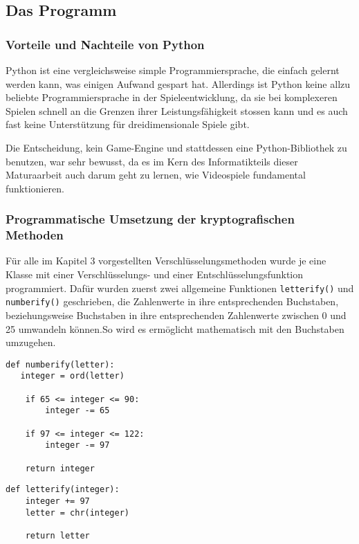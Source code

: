 \subsection{Das Programm}

\subsubsection{Vorteile und Nachteile von Python}
Python ist eine vergleichsweise simple Programmiersprache, die einfach gelernt werden kann, was einigen Aufwand gespart hat. Allerdings ist Python keine allzu beliebte Programmiersprache in der Spieleentwicklung, da sie bei komplexeren Spielen schnell an die Grenzen ihrer Leistungsfähigkeit stossen kann und es auch fast keine Unterstützung für dreidimensionale Spiele gibt.
 
Die Entscheidung, kein Game-Engine und stattdessen eine Python-Bibliothek zu benutzen, war sehr bewusst, da es im Kern des Informatikteils dieser Maturaarbeit auch darum geht zu lernen, wie Videospiele fundamental funktionieren. 

\subsubsection{Programmatische Umsetzung der kryptografischen Methoden}
Für alle im Kapitel 3 vorgestellten Verschlüsselungsmethoden wurde je eine Klasse mit einer Verschlüsselungs- und einer Entschlüsselungsfunktion programmiert. Dafür wurden zuerst zwei allgemeine Funktionen \verb+letterify()+ und \verb+numberify()+ geschrieben, die Zahlenwerte in ihre entsprechenden Buchstaben, beziehungsweise Buchstaben in ihre entsprechenden Zahlenwerte zwischen 0 und 25 umwandeln können.So wird es ermöglicht mathematisch mit den Buchstaben umzugehen.

\begin{Verbatim}
def numberify(letter):
   integer = ord(letter)

    if 65 <= integer <= 90:
        integer -= 65

    if 97 <= integer <= 122:
        integer -= 97

    return integer
\end{Verbatim}

\newpage

\begin{Verbatim}
def letterify(integer):
    integer += 97
    letter = chr(integer)

    return letter
\end{Verbatim}

